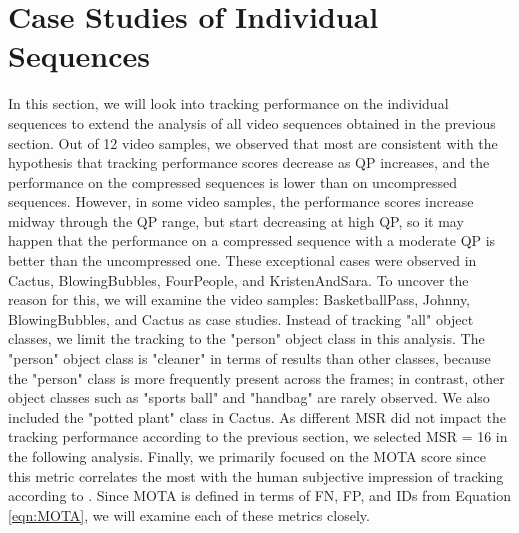 \section{Case Studies of Individual Sequences}
\label{sec:results/section_b}

In this section, we will look into tracking performance on the individual sequences to extend the analysis of all video sequences obtained in the previous section. Out of 12 video samples, we observed that most are consistent with the hypothesis that tracking performance scores decrease as QP increases, and the performance on the compressed sequences is lower than on uncompressed sequences. However, in some video samples, the performance scores increase midway through the QP range, but start decreasing at high QP, so it may happen that the performance on a compressed sequence with a moderate QP is better than the uncompressed one. These exceptional cases were observed in Cactus, BlowingBubbles, FourPeople, and KristenAndSara. To uncover the reason for this, we will examine the video samples: BasketballPass, Johnny, BlowingBubbles, and Cactus as case studies. Instead of tracking "all" object classes, we limit the tracking to the "person" object class in this analysis. The "person" object class is "cleaner" in terms of results than other classes, because the "person" class is more frequently present across the frames; in contrast, other object classes such as "sports ball" and "handbag" are rarely observed. We also included the "potted plant" class in Cactus. As different MSR did not impact the tracking performance according to the previous section, we selected MSR = 16 in the following analysis. Finally, we primarily focused on the MOTA score since this metric correlates the most with the human subjective impression of tracking according to \cite{leal-taixe_motchallenge_2015}. Since MOTA is defined in terms of FN, FP, and IDs from Equation \eqref{eqn:MOTA}, we will examine each of these metrics closely.


